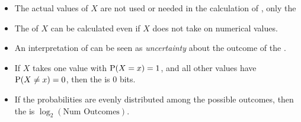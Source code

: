 \begin{itemize}[noitemsep]
\item The actual values of $X$ are not used or needed in the calculation of , only the 
\item The  of $X$ can be calculated even if $X$ does not take on numerical values.
\item An interpretation of  can be seen as \emph{uncertainty} about the outcome of the .
\item If $X$ takes one value with $\operatorname{\operatorname{P}}(X=x) = 1$, and all other values have $\operatorname{\operatorname{P}}(X \neq x) = 0$, then the  is 0 bits.
\item If the probabilities are evenly distributed among the possible outcomes, then the  is $\log_{2}(\text{Num Outcomes})$.
\end{itemize}

